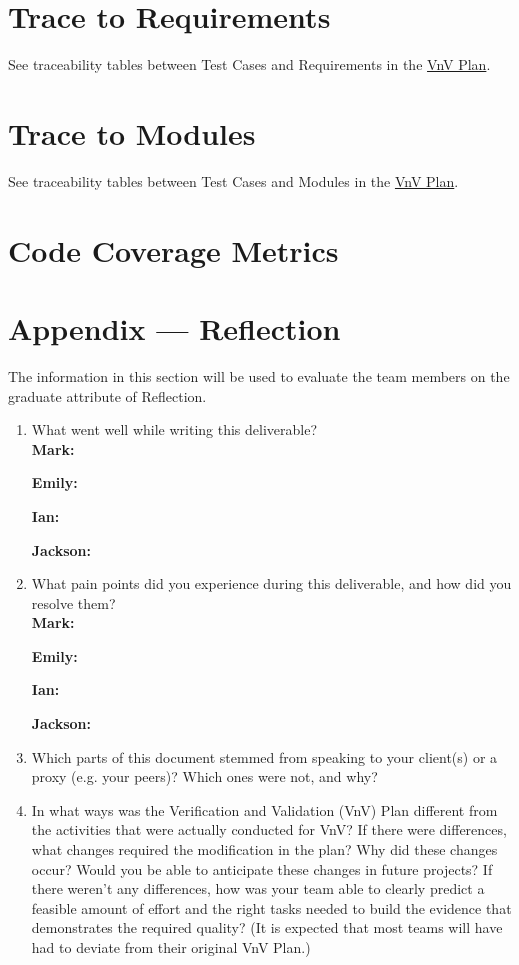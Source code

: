 \documentclass[12pt, titlepage]{article}
\begin{document}
\section{Trace to Requirements}
See traceability tables between Test Cases and Requirements in the \href{https://github.com/emilyperica/ScoreGen/blob/main/docs/VnVPlan/VnVPlan.pdf}{VnV Plan}.
		
\section{Trace to Modules}		
See traceability tables between Test Cases and Modules in the \href{https://github.com/emilyperica/ScoreGen/blob/main/docs/VnVPlan/VnVPlan.pdf}{VnV Plan}.

\section{Code Coverage Metrics}




\newpage{}
\section*{Appendix --- Reflection}

The information in this section will be used to evaluate the team members on the
graduate attribute of Reflection.



\begin{enumerate}
  \item What went well while writing this deliverable? \\
  \textbf{Mark:}

  \textbf{Emily:}

  \textbf{Ian:}

  \textbf{Jackson:}

  \item What pain points did you experience during this deliverable, and how
    did you resolve them?\\
  \textbf{Mark:}

  \textbf{Emily:}

  \textbf{Ian:}

  \textbf{Jackson:}

  \item Which parts of this document stemmed from speaking to your client(s) or
  a proxy (e.g. your peers)? Which ones were not, and why?
  \item In what ways was the Verification and Validation (VnV) Plan different
  from the activities that were actually conducted for VnV?  If there were
  differences, what changes required the modification in the plan?  Why did
  these changes occur?  Would you be able to anticipate these changes in future
  projects?  If there weren't any differences, how was your team able to clearly
  predict a feasible amount of effort and the right tasks needed to build the
  evidence that demonstrates the required quality?  (It is expected that most
  teams will have had to deviate from their original VnV Plan.)
  
\end{enumerate}
\end{document}
